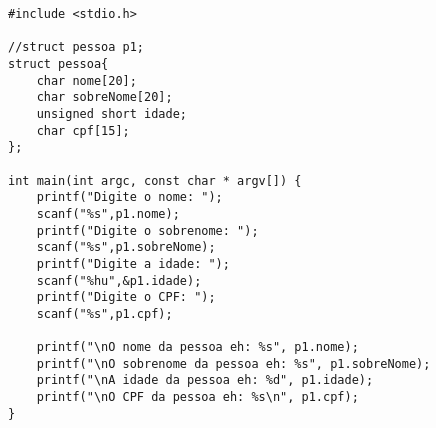 \begin{verbatim}
#include <stdio.h>

//struct pessoa p1;
struct pessoa{
	char nome[20];
	char sobreNome[20];
	unsigned short idade;
	char cpf[15];
};

int main(int argc, const char * argv[]) {
	printf("Digite o nome: ");
	scanf("%s",p1.nome);
	printf("Digite o sobrenome: ");
	scanf("%s",p1.sobreNome);
	printf("Digite a idade: ");
	scanf("%hu",&p1.idade);
	printf("Digite o CPF: ");
	scanf("%s",p1.cpf);

	printf("\nO nome da pessoa eh: %s", p1.nome);
	printf("\nO sobrenome da pessoa eh: %s", p1.sobreNome);
	printf("\nA idade da pessoa eh: %d", p1.idade);
	printf("\nO CPF da pessoa eh: %s\n", p1.cpf);
}
\end{verbatim}
